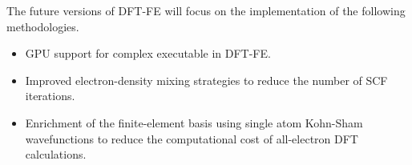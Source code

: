 The future versions of DFT-FE will focus on the implementation of the following methodologies.
\begin{itemize}
\item GPU support for complex executable in DFT-FE.	
\item Improved electron-density mixing strategies to reduce the number of SCF iterations.
\item Enrichment of the finite-element basis using single atom Kohn-Sham wavefunctions to reduce the computational cost of all-electron DFT calculations.
\end{itemize} 
